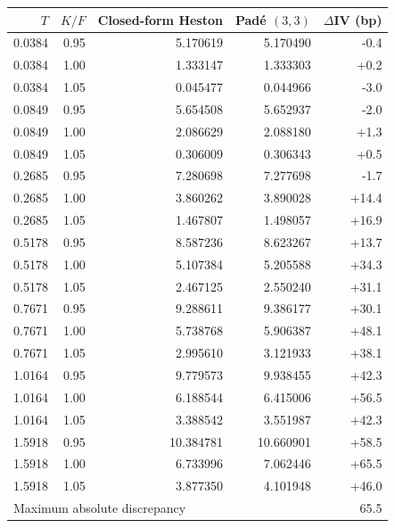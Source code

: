\begin{tabular}{rrrrr}
\toprule
$T$ & $K/F$ & Closed-form Heston & Pad\'e $(3,3)$ & $\Delta$IV (bp)\\
\midrule
0.0384 & 0.95 & 5.170619 & 5.170490 & -0.4\\
0.0384 & 1.00 & 1.333147 & 1.333303 & +0.2\\
0.0384 & 1.05 & 0.045477 & 0.044966 & -3.0\\
0.0849 & 0.95 & 5.654508 & 5.652937 & -2.0\\
0.0849 & 1.00 & 2.086629 & 2.088180 & +1.3\\
0.0849 & 1.05 & 0.306009 & 0.306343 & +0.5\\
0.2685 & 0.95 & 7.280698 & 7.277698 & -1.7\\
0.2685 & 1.00 & 3.860262 & 3.890028 & +14.4\\
0.2685 & 1.05 & 1.467807 & 1.498057 & +16.9\\
0.5178 & 0.95 & 8.587236 & 8.623267 & +13.7\\
0.5178 & 1.00 & 5.107384 & 5.205588 & +34.3\\
0.5178 & 1.05 & 2.467125 & 2.550240 & +31.1\\
0.7671 & 0.95 & 9.288611 & 9.386177 & +30.1\\
0.7671 & 1.00 & 5.738768 & 5.906387 & +48.1\\
0.7671 & 1.05 & 2.995610 & 3.121933 & +38.1\\
1.0164 & 0.95 & 9.779573 & 9.938455 & +42.3\\
1.0164 & 1.00 & 6.188544 & 6.415006 & +56.5\\
1.0164 & 1.05 & 3.388542 & 3.551987 & +42.3\\
1.5918 & 0.95 & 10.384781 & 10.660901 & +58.5\\
1.5918 & 1.00 & 6.733996 & 7.062446 & +65.5\\
1.5918 & 1.05 & 3.877350 & 4.101948 & +46.0\\
\midrule
\multicolumn{4}{l}{Maximum absolute discrepancy} & 65.5\\
\bottomrule
\end{tabular}
